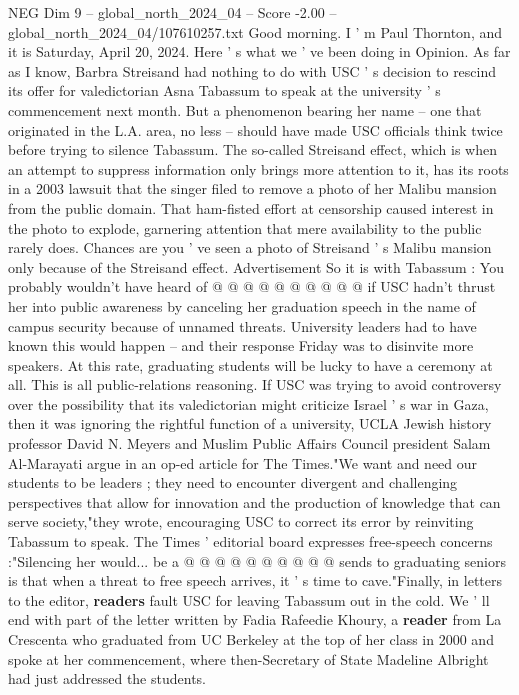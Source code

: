 \begin{textsample}{NEG Dim 9 – global\_north\_2024\_04 – Score -2.00 – global\_north\_2024\_04/107610257.txt}  \label{ex:f9_neg_220}
Good morning.
I ' m Paul Thornton, and it is Saturday, April 20, 2024.
Here ' s what we ' ve been doing in Opinion.
As far as I know, Barbra Streisand had nothing to do with USC ' s decision to rescind its offer for valedictorian Asna Tabassum to speak at the university ' s commencement next month.
But a phenomenon bearing her name -- one that originated in the L.A. area, no less -- should have made USC officials think twice before trying to silence Tabassum.
The so-called Streisand effect, which is when an attempt to suppress information only brings more attention to it, has its roots in a 2003 lawsuit that the singer filed to remove a photo of her Malibu mansion from the public domain.
That ham-fisted effort at censorship caused interest in the photo to explode, garnering attention that mere availability to the public rarely does.
Chances are you ' ve seen a photo of Streisand ' s Malibu mansion only because of the Streisand effect.
Advertisement So it is with Tabassum : You probably wouldn't have heard of @ @ @ @ @ @ @ @ @ @ if USC hadn't thrust her into public awareness by canceling her graduation speech in the name of campus security because of unnamed threats.
University leaders had to have known this would happen -- and their response Friday was to disinvite more speakers.
At this rate, graduating students will be lucky to have a ceremony at all.
This is all public-relations reasoning.
If USC was trying to avoid controversy over the possibility that its valedictorian might criticize Israel ' s war in Gaza, then it was ignoring the rightful function of a university, UCLA Jewish history professor David N.
Meyers and Muslim Public Affairs Council president Salam Al-Marayati argue in an op-ed article for The Times."We want and need our students to be leaders ; they need to encounter divergent and challenging perspectives that allow for innovation and the production of knowledge that can serve society,"they wrote, encouraging USC to correct its error by reinviting Tabassum to speak.
The Times ' editorial board expresses free-speech concerns :"Silencing her would... be a @ @ @ @ @ @ @ @ @ @ sends to graduating seniors is that when a threat to free speech arrives, it ' s time to cave."Finally, in letters to the editor, \textbf{readers} fault USC for leaving Tabassum out in the cold.
We ' ll end with part of the letter written by Fadia Rafeedie Khoury, a \textbf{reader} from La Crescenta who graduated from UC Berkeley at the top of her class in 2000 and spoke at her commencement, where then-Secretary of State Madeline Albright had just addressed the students.

\end{textsample}
